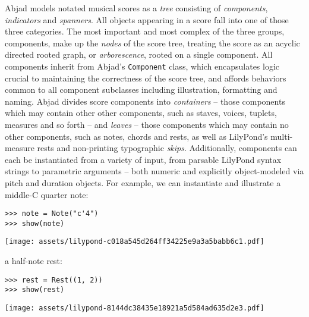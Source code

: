 Abjad models notated musical scores as a \emph{tree} consisting of
\emph{components}, \emph{indicators} and \emph{spanners}. All objects appearing
in a score fall into one of those three categories. The most important and most
complex of the three groups, components, make up the \emph{nodes} of the score
tree, treating the score as an acyclic directed rooted graph, or
\emph{arborescence}, rooted on a single component. All components inherit from
Abjad's \texttt{Component} class, which encapsulates logic crucial to
maintaining the correctness of the score tree, and affords behaviors common to
all component subclasses including illustration, formatting and naming. Abjad
divides score components into \emph{containers} -- those components which may
contain other other components, such as staves, voices, tuplets, measures and
so forth -- and \emph{leaves} -- those components which may contain no other
components, such as notes, chords and rests, as well as LilyPond's
multi-measure rests and non-printing typographic \emph{skips}. Additionally,
components can each be instantiated from a variety of input, from parsable
LilyPond syntax strings to parametric arguments -- both numeric and explicitly
object-modeled via pitch and duration objects. For example, we can instantiate
and illustrate a middle-C quarter note:

\begin{comment}
<abjad>
note = Note("c'4")
show(note)
</abjad>
\end{comment}

\begin{abjadbookoutput}
\begin{singlespacing}
\vspace{-0.5\baselineskip}
\begin{verbatim}
>>> note = Note("c'4")
>>> show(note)
\end{verbatim}
\noindent\texttt{[image: assets/lilypond-c018a545d264ff34225e9a3a5babb6c1.pdf]}
\end{singlespacing}
\end{abjadbookoutput}

\noindent a half-note rest:

\begin{comment}
<abjad>
rest = Rest((1, 2))
show(rest)
</abjad>
\end{comment}

\begin{abjadbookoutput}
\begin{singlespacing}
\vspace{-0.5\baselineskip}
\begin{verbatim}
>>> rest = Rest((1, 2))
>>> show(rest)
\end{verbatim}
\noindent\texttt{[image: assets/lilypond-8144dc38435e18921a5d584ad635d2e3.pdf]}
\end{singlespacing}
\end{abjadbookoutput}

